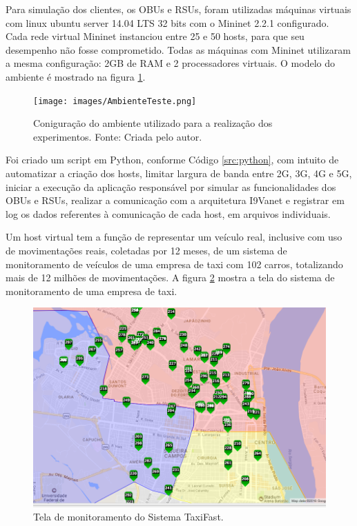 \documentclass[
	12pt,				%
	oneside,			%
	a4paper,			%
	english,			%
	brazil				%
	]{abntex2ppgsi}
\begin{document}

Para simulação dos clientes, os OBUs e RSUs, foram utilizadas máquinas virtuais com linux ubuntu server 14.04 LTS 32 bits com o Mininet 2.2.1 configurado. Cada rede virtual Mininet instanciou entre 25 e 50 hosts, para que seu desempenho não fosse comprometido. Todas as máquinas com Mininet  utilizaram a mesma configuração:  2GB de RAM e 2 processadores virtuais. O modelo do ambiente é mostrado na figura \ref{fig:cenarioConsiderado}.


\begin{figure}[h!]
	\centering
	\texttt{[image: images/AmbienteTeste.png]}
	\caption{Coniguração do ambiente utilizado para a realização dos experimentos. Fonte: Criada pelo autor.}
	\label{fig:cenarioConsiderado}
\end{figure}

Foi criado um script em Python, conforme Código \ref{src:python}, com intuito de automatizar a criação dos hosts, limitar largura de banda entre 2G, 3G, 4G e 5G, iniciar a execução da aplicação responsável por simular as funcionalidades dos OBUs e RSUs,  realizar a comunicação com a arquitetura I9Vanet e registrar em log os dados referentes à comunicação de cada host, em arquivos individuais.

Um host virtual tem a função de representar um veículo real, inclusive com uso de movimentações reais, coletadas por 12 meses, de um sistema de monitoramento de veículos de uma empresa de taxi com 102 carros, totalizando mais de 12 milhões de movimentações. A figura \ref{fig:monitoramento} mostra a tela do sistema de monitoramento de uma empresa de taxi.

\begin{figure}[h!]
	\centering
	\includegraphics[width=1.0\columnwidth]{images/taxi_mapa.png}
	\caption{Tela de monitoramento do Sistema TaxiFast.}
	\label{fig:monitoramento}
\end{figure}
\end{document}
